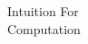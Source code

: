 \thispagestyle{empty}

\begin{center}
    \vspace*{8cm}
    {\fontsize{32}{38}\selectfont
        Intuition For \\[3mm]
        Computation
    }
\end{center}

